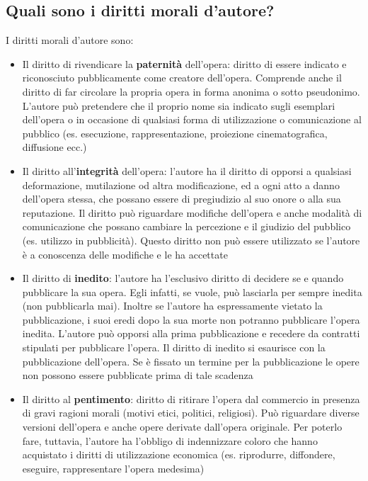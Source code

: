 \subsection{Quali sono i diritti morali d'autore?}
I diritti morali d'autore sono:
\begin{itemize}
    \item Il diritto di rivendicare la \textbf{paternità} dell'opera: \newline
    diritto di essere indicato e riconosciuto pubblicamente come creatore dell'opera.\newline
    Comprende anche il diritto di far circolare la propria opera in forma anonima o
    sotto pseudonimo. \newline
    L'autore può pretendere che il proprio nome sia indicato sugli esemplari dell'opera
    o in occasione di qualsiasi forma di utilizzazione o comunicazione al pubblico
    (es. esecuzione, rappresentazione, proiezione cinematografica, diffusione ecc.)
    \item Il diritto all'\textbf{integrità} dell'opera: l'autore ha il diritto di opporsi a qualsiasi
    deformazione, mutilazione od altra modificazione, ed a ogni atto a danno dell'opera stessa, che possano
    essere di pregiudizio al suo onore o alla sua reputazione.\newline
    Il diritto può riguardare modifiche dell'opera e anche modalità di comunicazione
    che possano cambiare la percezione e il giudizio del pubblico (es. utilizzo in pubblicità).
    Questo diritto non può essere utilizzato se l'autore è a conoscenza delle modifiche e le ha accettate
    \item Il diritto di \textbf{inedito}: l'autore ha l'esclusivo diritto di decidere se e quando
    pubblicare la sua opera. Egli infatti, se vuole, può lasciarla per sempre inedita (non pubblicarla
    mai). Inoltre se l'autore ha espressamente vietato la pubblicazione, i suoi eredi dopo la sua morte
    non potranno pubblicare l'opera inedita.\newline
    L'autore può opporsi alla prima pubblicazione e recedere da contratti stipulati per pubblicare l'opera.\newline
    Il diritto di inedito si esaurisce con la pubblicazione dell'opera.\newline
    Se è fissato un termine per la pubblicazione le opere non possono essere pubblicate
    prima di tale scadenza
    \item Il diritto al \textbf{pentimento}: diritto di ritirare l'opera dal commercio in presenza
    di gravi ragioni morali (motivi etici, politici, religiosi).
    Può riguardare diverse versioni dell'opera e anche opere derivate dall'opera originale.\newline
    Per poterlo fare, tuttavia, l'autore ha l'obbligo di indennizzare coloro che hanno
    acquistato i diritti di utilizzazione economica (es. riprodurre, diffondere, eseguire, rappresentare
    l'opera medesima)
\end{itemize}


